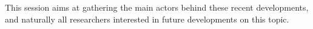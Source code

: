 \documentclass[12pt,english]{article}
\begin{document}

This session aims at gathering the main actors behind these recent
developments, and naturally all researchers interested in future developments
on this topic.

\end{document}
